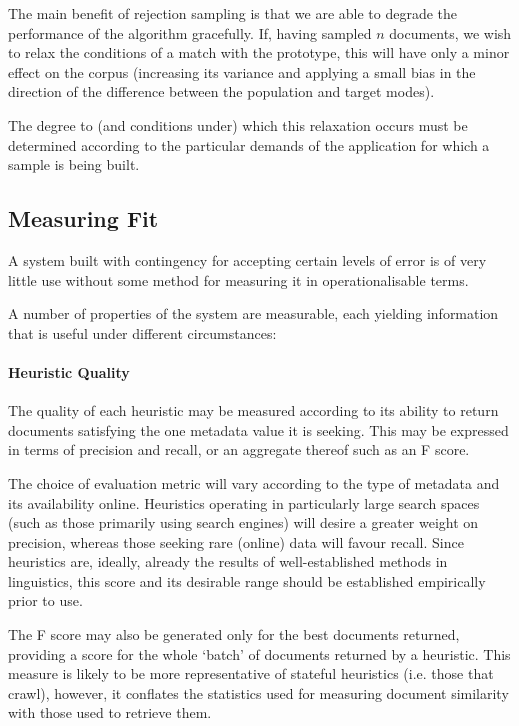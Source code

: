 The main benefit of rejection sampling is that we are able to degrade the performance of the algorithm gracefully.  If, having sampled $n$ documents, we wish to relax the conditions of a match with the prototype, this will have only a minor effect on the corpus (increasing its variance and applying a small bias in the direction of the difference between the population and target modes).  

The degree to (and conditions under) which this relaxation occurs must be determined according to the particular demands of the application for which a sample is being built.



\subsection{Measuring Fit}
A system built with contingency for accepting certain levels of error is of very little use without some method for measuring it in operationalisable terms.

A number of properties of the system are measurable, each yielding information that is useful under different circumstances:


\paragraph{Heuristic Quality}
The quality of each heuristic may be measured according to its ability to return documents satisfying the one metadata value it is seeking.  This may be expressed in terms of precision and recall, or an aggregate thereof such as an F score.


The choice of evaluation metric will vary according to the type of metadata and its availability online.  Heuristics operating in particularly large search spaces (such as those primarily using search engines) will desire a greater weight on precision, whereas those seeking rare (online) data will favour recall.  Since heuristics are, ideally, already the results of well-established methods in linguistics, this score and its desirable range should be established empirically prior to use.

The F score may also be generated only for the best documents returned, providing a score for the whole `batch' of documents returned by a heuristic.  This measure is likely to be more representative of stateful heuristics (i.e. those that crawl), however, it conflates the statistics used for measuring document similarity with those used to retrieve them.


